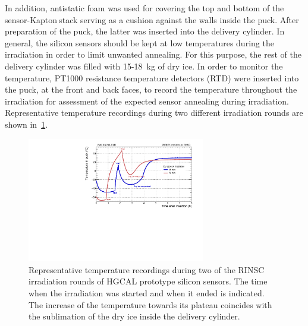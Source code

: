 In addition, antistatic foam was used for covering the top and bottom of the sensor-Kapton\texttrademark$~$stack serving as a cushion  against the walls inside the puck.
After preparation of the puck, the latter was inserted into the delivery cylinder.
In general, the silicon sensors should be kept at low temperatures during the irradiation in order to limit unwanted annealing.
For this purpose, the rest of the delivery cylinder was filled with 15-\SI{18}{\kilo\gram} of dry ice.
In order to monitor the temperature, PT1000 resistance temperature detectors (RTD) were inserted into the puck, at the front and back faces, to record the temperature throughout the irradiation for assessment of the expected sensor annealing during irradiation. 
Representative temperature recordings during two different irradiation rounds are shown in~\ref{fig:Round_10_Temperature_Profile}.
\begin{figure}
  \begin{center}
    \includegraphics[width=0.69\textwidth]{plots/RINSC_temp/RINSC_temp.pdf}
    \caption{Representative temperature recordings during two of the RINSC irradiation rounds of HGCAL prototype silicon sensors. 
    The time when the irradiation was started and when it ended is indicated.
    The increase of the temperature towards its plateau coincides with the sublimation of the dry ice inside the delivery cylinder.
    }
    \label{fig:Round_10_Temperature_Profile}
  \end{center}
\end{figure}
